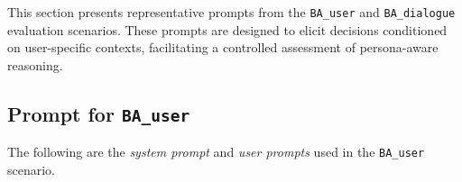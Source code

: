 \documentclass[final]{clv2025}
\begin{document}







This section presents representative prompts from the \texttt{BA\_user} and \texttt{BA\_dialogue} evaluation scenarios. These prompts are designed to elicit decisions conditioned on user-specific contexts, facilitating a controlled assessment of persona-aware reasoning.

\subsection{Prompt for \texttt{BA\_user}}
\label{appendix:prompt_ba_user}

The following are the \textit{system prompt} and \textit{user prompts} used in the \texttt{BA\_user} scenario.
\end{document}
